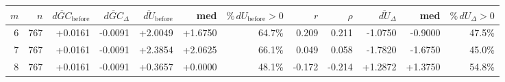 \begingroup
{}
\small
\setlength{\tabcolsep}{2pt}
\renewcommand{\arraystretch}{1.15}
\setlength{\LTleft}{0pt}
\setlength{\LTright}{0pt}
\begin{longtable}{r r r r r r r r r r r r}
\toprule
$m$ & $n$ & $\overline{dGC}_{\mathrm{before}}$ & $\overline{dGC}_{\Delta}$ & $\overline{dU}_{\mathrm{before}}$ & med & $\%\,dU_{\mathrm{before}}>0$ & $r$ & $\rho$ & $\overline{dU}_{\Delta}$ & med & $\%\,dU_{\Delta}>0$ \\
\midrule
6 & 767 & +0.0161 & -0.0091 & +2.0049 & +1.6750 & 64.7\% & 0.209 & 0.211 & -1.0750 & -0.9000 & 47.5\% \\
7 & 767 & +0.0161 & -0.0091 & +2.3854 & +2.0625 & 66.1\% & 0.049 & 0.058 & -1.7820 & -1.6750 & 45.0\% \\
8 & 767 & +0.0161 & -0.0091 & +0.3657 & +0.0000 & 48.1\% & -0.172 & -0.214 & +1.2872 & +1.3750 & 54.8\% \\
\bottomrule
\end{longtable}
\endgroup

